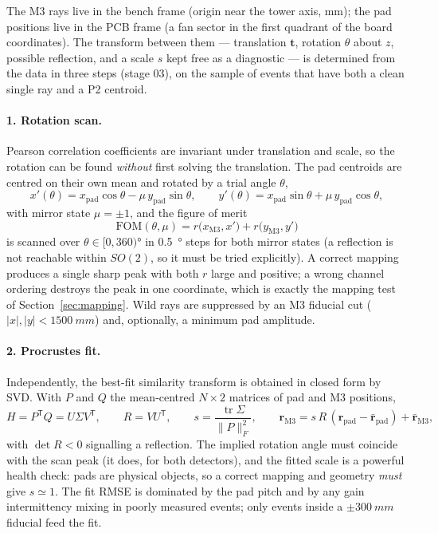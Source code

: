 \documentclass[11pt,a4paper]{article}
\begin{document}
The M3 rays live in the bench frame (origin near the tower axis, mm); the pad
positions live in the PCB frame (a fan sector in the first quadrant of the
board coordinates). The transform between them --- translation
$\mathbf{t}$, rotation $\theta$ about $z$, possible reflection, and a scale
$s$ kept free as a diagnostic --- is determined from the data in three steps
(stage 03), on the sample of events that have both a clean single ray and a
P2 centroid.

\paragraph{1. Rotation scan.}
Pearson correlation coefficients are invariant under translation and scale,
so the rotation can be found \emph{without} first solving the translation.
The pad centroids are centred on their own mean and rotated by a trial angle
$\theta$,
\begin{equation}
  x'(\theta) = x_\text{pad}\cos\theta - \mu\,y_\text{pad}\sin\theta,\qquad
  y'(\theta) = x_\text{pad}\sin\theta + \mu\,y_\text{pad}\cos\theta,
\end{equation}
with mirror state $\mu = \pm 1$, and the figure of merit
\begin{equation}
  \mathrm{FOM}(\theta,\mu) = r\bigl(x_\text{M3}, x'\bigr)
                           + r\bigl(y_\text{M3}, y'\bigr)
\end{equation}
is scanned over $\theta \in [0,360)$\si{\degree} in \SI{0.5}{\degree} steps
for both mirror states (a reflection is not reachable within $SO(2)$, so it
must be tried explicitly). A correct mapping produces a single sharp peak
with both $r$ large and positive; a wrong channel ordering destroys the peak
in one coordinate, which is exactly the mapping test of
Section~\ref{sec:mapping}. Wild rays are suppressed by an M3 fiducial cut
($|x|,|y| < \SI{1500}{mm}$) and, optionally, a minimum pad amplitude.

\paragraph{2. Procrustes fit.}
Independently, the best-fit similarity transform is obtained in closed form
by SVD. With $P$ and $Q$ the mean-centred $N\times2$ matrices of pad and M3
positions,
\begin{equation}
  H = P^{\mathsf T} Q = U \Sigma V^{\mathsf T}, \qquad
  R = V U^{\mathsf T}, \qquad
  s = \frac{\operatorname{tr}\Sigma}{\lVert P \rVert_F^2}, \qquad
  \mathbf{r}_\text{M3} = s\,R\,(\mathbf{r}_\text{pad} - \bar{\mathbf{r}}_\text{pad})
                        + \bar{\mathbf{r}}_\text{M3},
  \label{eq:procrustes}
\end{equation}
with $\det R < 0$ signalling a reflection. The implied rotation angle must
coincide with the scan peak (it does, for both detectors), and the fitted
scale is a powerful health check: pads are physical objects, so a correct
mapping and geometry \emph{must} give $s \simeq 1$. The fit RMSE is dominated
by the pad pitch and by any gain intermittency mixing in poorly measured
events; only events inside a $\pm\SI{300}{mm}$ fiducial feed the fit.
\end{document}
